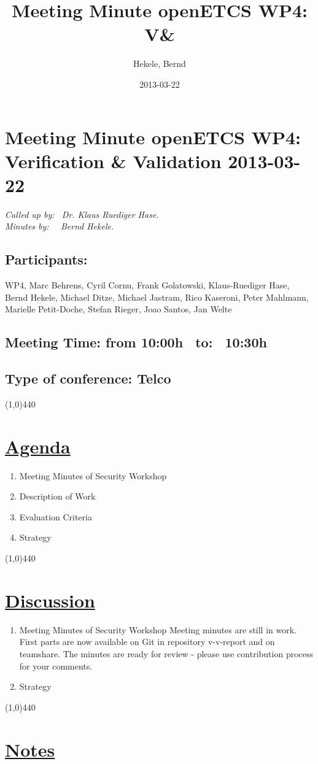\documentclass[a4paper]{article}
\title{Meeting Minute openETCS WP4: V&\V}
\author{Hekele, Bernd}
\date{2013-03-22}
\begin{document}
\section*{\large{Meeting Minute openETCS WP4: Verification \& Validation 2013-03-22}}

\emph{Called up by: \ Dr. Klaus Ruediger Hase.}\\
\emph{Minutes by: \ \  Bernd Hekele.}


\subsection*{Participants:} WP4, 
Marc Behrens, 
Cyril Cornu, 
Frank Golatowski, 
Klaus-Ruediger Hase, 
Bernd Hekele,
Michael Ditze,
Michael Jastram, 
Rico Kaseroni, 
Peter Mahlmann, 
Marielle Petit-Doche, 
Stefan Rieger,
Joao Santos, 
Jan Welte\\


\subsection*{Meeting Time: from 10:00h \ to: \ 10:30h}

\subsection*{Type of conference: Telco}

\line(1,0){440}
\section*{\underline{Agenda}}
\begin{enumerate}
\item Meeting Minutes of Security Workshop
\item Description of Work
\item Evaluation Criteria
\item Strategy
\end{enumerate}
\line(1,0){440}
\section*{\underline{Discussion}}

\begin{enumerate}
\item Meeting Minutes of Security Workshop
Meeting minutes are still in work. First parts are now available on Git in repository v-v-report 
and on teamshare. The minutes are ready for review - please use contribution process for your comments.\\

\item Strategy
\end{enumerate}

\line(1,0){440}
\section*{\underline{Notes}}
\end{document}
